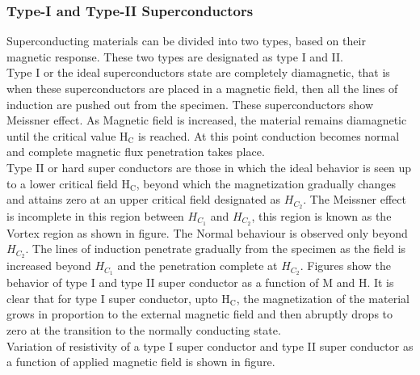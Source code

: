 \subsubsection{Type-I and Type-II Superconductors}
Superconducting materials can be divided into two types, based on their magnetic response. These two types are designated as type I and II.\\
Type I or the ideal superconductors state are completely diamagnetic, that is when these superconductors are placed in a magnetic field, then all the lines of induction are pushed out from the specimen. These superconductors show Meissner effect. As Magnetic field is increased, the material remains diamagnetic until the critical value $\mathrm{H}_{\mathrm{C}}$ is reached. At this point conduction becomes normal and complete magnetic flux penetration takes place.\\
Type II or hard super conductors are those in which the ideal behavior is seen up to a lower critical field $\mathrm{H}_{\mathrm{C}}$, beyond which the magnetization gradually changes and attains zero at an upper critical field designated as $H_{C_{2}}$. The Meissner effect is incomplete in this region between $H_{C_{1}}$ and $H_{C_{2}}$, this region is known as the Vortex region as shown in figure. The Normal behaviour is observed only beyond $H_{C_{2}}$. The lines of induction penetrate gradually from the specimen as the field is increased beyond $H_{C_{1}}$ and the penetration complete at $H_{C_{2}}$. Figures show the behavior of type I and type II super conductor as a function of $\mathrm{M}$ and $\mathrm{H}$. It is clear that for type I super conductor, upto $\mathrm{H}_{\mathrm{C}}$, the magnetization of the material grows in proportion to the external magnetic field and then abruptly drops to zero at the transition to the normally conducting state.\\
Variation of resistivity of a type I super conductor and type II super conductor as a function of applied magnetic field is shown in figure.
